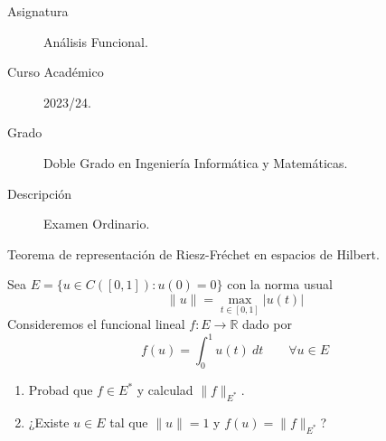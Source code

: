\documentclass[12pt]{article}
\begin{document}

    
    

    \begin{description}
        \item[Asignatura] Análisis Funcional.
        \item[Curso Académico] 2023/24.
        \item[Grado] Doble Grado en Ingeniería Informática y Matemáticas.
        \item[Descripción] Examen Ordinario.
    
    \end{description}
    \newpage


    
    \begin{ejercicio}[3 puntos]
        Teorema de representación de Riesz-Fréchet en espacios de Hilbert.
    \end{ejercicio}

    \begin{ejercicio}[2.5 puntos]
        Sea $E = \{u\in C([0,1]) : u(0) = 0\}$ con la norma usual
        \begin{equation*}
            \|u\| = \max_{t\in [0,1]}|u(t)|
        \end{equation*}
        Consideremos el funcional lineal $f:E\to \mathbb{R}$ dado por
        \begin{equation*}
            f(u) = \int_{0}^{1} u(t)~dt \qquad \forall u\in E
        \end{equation*}
        \begin{enumerate}[label=\alph*)]
            \item Probad que $f\in E^\ast$ y calculad $\|f\|_{E^\ast}$.
            \item ¿Existe $u\in E$ tal que $\|u\| = 1$ y $f(u) = \|f\|_{E^\ast}$?
        \end{enumerate}
    \end{ejercicio}
\end{document}
